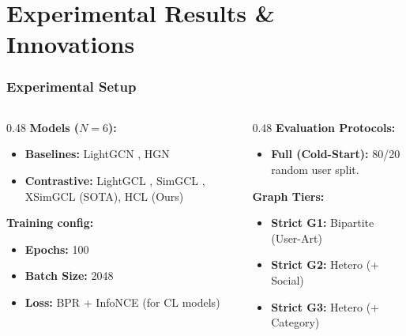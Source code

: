 \documentclass{beamer}
\begin{document}
\section{Experimental Results \& Innovations}

\begin{frame}
    \frametitle{Experimental Setup}
    \begin{columns}
        \begin{column}{0.48\textwidth}
            \textbf{Models ($N=6$):}
            \begin{itemize}
                \item \textbf{Baselines:} LightGCN \cite{he2020lightgcn}, HGN
                \item \textbf{Contrastive:} LightGCL \cite{cai2023lightgcl}, SimGCL \cite{yu2022graph}, XSimGCL \cite{yu2023xsimgcl} (SOTA), HCL (Ours)
            \end{itemize}

            \vspace{0.2cm}
            \textbf{Training config:}
            \begin{itemize}
                \item \textbf{Epochs:} 100
                \item \textbf{Batch Size:} 2048
                \item \textbf{Loss:} BPR + InfoNCE (for CL models)
            \end{itemize}
        \end{column}

        \begin{column}{0.48\textwidth}
            \textbf{Evaluation Protocols:}
            \begin{itemize}
                \item \textbf{Full (Cold-Start):} 80/20 random user split.
            \end{itemize}

            \vspace{0.2cm}
            \textbf{Graph Tiers:}
            \begin{itemize}
                \item \textbf{Strict G1:} Bipartite (User-Art)
                \item \textbf{Strict G2:} Hetero (+ Social)
                \item \textbf{Strict G3:} Hetero (+ Category)
            \end{itemize}
        \end{column}
    \end{columns}

    \vspace{0.3cm}
\end{frame}
\end{document}
